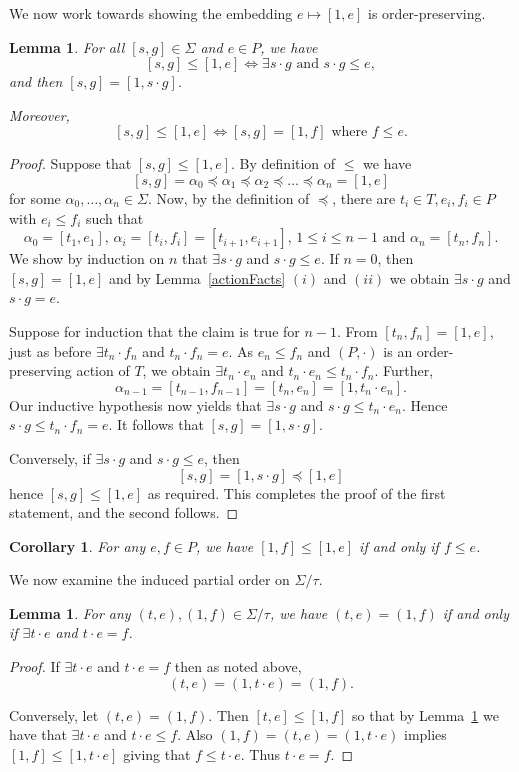 \documentclass[12pt]{amsart}
\newtheorem{lem}[them]{Lemma}
\newtheorem{cor}[them]{Corollary}
\theoremstyle{definition}
\theoremstyle{definition}
\numberwithin{them}{section}
\numberwithin{equation}{section}
\begin{document}
 We now work towards showing the embedding $e\mapsto [1,e]$ is order-preserving. 
\begin{lem}\label{lem:firstorderideal}
For all $[s,g]\in \Sigma$ and $e \in P$, we have
\[[s,g]\leq [1,e]\Leftrightarrow \exists s\cdot g\mbox{ and }s\cdot g\leq e,\]
and then $[s,g]=[1,s\cdot g]$.

Moreover, 
\[[s,g]\leq [1,e]\Leftrightarrow [s,g]=[1,f]\mbox{ where }f\leq e.\]
\end{lem}
\begin{proof}
Suppose that 
$[s,g]\leq [1,e]$. By definition of $\leq$  we have
\[[s, g]= \alpha_0 \preceq \alpha_1 \preceq \alpha_2 \preceq \dots \preceq \alpha_n =[1,e] \]
for some $\alpha_0, \dots, \alpha_{n} \in \Sigma$. 
Now, by the definition of $\preceq$, there are $t_i\in T,
e_i,f_i\in P$ with $e_i\leq f_i$ such that
\[\alpha_0=[t_1,e_1],\, \alpha_i=[t_i, f_i]=
[t_{i+1}, e_{i+1}],\,  1\leq i\leq n-1\mbox{ and } \alpha_n=[t_n,f_n].\]  
We show by induction on $n$ that $\exists s\cdot g$ and $s\cdot g\leq e$. If $n=0$, then
$[s,g]=[1,e]$ and by Lemma~\ref{actionFacts} $(i)$ and  $(ii)$  we obtain 
$\exists s\cdot g$ and $s\cdot g=e$.

Suppose for induction that the claim is true for $n-1$. From $[t_n,f_n]=[1,e]$,  just as before 
$\exists t_n \cdot f_n$ and $t_n \cdot f_n = e$. As $e_n \leq f_n$ and $(P,\cdot)$ is an order-preserving action of $T$,  we obtain   $\exists t_n \cdot e_n$ and $t_n \cdot e_n \leq t_n \cdot f_n$. Further,
\[\alpha_{n-1}=[t_{n-1},f_{n-1}]=[t_n,e_n]=[1, t_n\cdot e_n].\] Our inductive hypothesis now
yields that $\exists s\cdot g$ and $s\cdot g\leq t_n\cdot e_n$. Hence $s\cdot g\leq t_n\cdot f_n=e$. It follows that 
 $[s,g]=[1, s\cdot g]$.

Conversely, if $\exists s\cdot g$ and $s\cdot g\leq e$, then 
\[[s,g]=[1,s\cdot g]\preceq[1,e]\]
hence $[s,g]\leq [1,e]$ as required.
This completes the proof of the first statement, and the second follows. 
\end{proof}

\begin{cor}\label{cor:equal} For any $e,f\in P$,
we  have $[1,f]\leq [1,e]$ if and only if $f\leq e$. 
\end{cor}

We now examine the induced partial order on $\Sigma/\tau$.

\begin{lem}\label{lem:harderequal} For any $(t,e), (1,f)\in \Sigma/\tau$,
we  have $(t,e)=(1,f)$ if and only if
$\exists t\cdot e$ and $t\cdot e= f$.
\end{lem}
\begin{proof} If $\exists t\cdot e$ and $t\cdot e=f$ then as noted above, 
\[(t,e)=(1, t\cdot e)=(1,f).\] 

Conversely, let $(t,e)=(1,f)$.
Then $[t,e]\leq [1,f]$ so that by Lemma~\ref{lem:firstorderideal} we have that
$\exists t\cdot e$ and $t\cdot e\leq f$. Also 
$(1,f)=(t,e)=(1, t\cdot e)$ implies 
$[1,f]\leq [1, t\cdot e]$ giving that $f\leq t\cdot e$. Thus $t\cdot e=f$.
    \end{proof}
    
\end{document}
